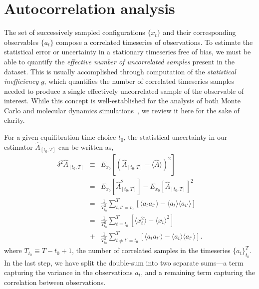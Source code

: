 \documentclass[aps,pre,twocolumn,nofootinbib,superscriptaddress,linenumbers,11point]{revtex4-1}
\newcommand{\expect}[1]{\langle #1 \rangle}                %
\newcommand{\estimator}[1]{\hat{#1}}                       %
\begin{document}

\section*{Autocorrelation analysis}
\label{section:statistical-inefficiency}

The set of successively sampled configurations $\{x_t\}$ and their corresponding observables $\{a_t\}$ compose a correlated timeseries of observations.
To estimate the statistical error or uncertainty in a stationary timeseries free of bias, we must be able to quantify the \emph{effective number of uncorrelated samples} present in the dataset.
This is usually accomplished through computation of the \emph{statistical inefficiency} $g$, which quantifies the number of correlated timeseries samples needed to produce a single effectively uncorrelated sample of the observable of interest.
While this concept is well-established for the analysis of both Monte Carlo and molecular dynamics simulations~\cite{mueller-krumbhaar:j-stat-phys:1973:monte-carlo-analysis,swope:jcp:1982:autocorrelation-analysis,janke:2002:error-analysis,chodera:jctc:2007:wham}, we review it here for the sake of clarity.

For a given equilibration time choice $t_0$, the statistical uncertainty in our estimator $\hat{A}_{[t_0,T]}$ can be written as,
\begin{eqnarray}
\delta^2 \estimator{A}_{[t_0,T]} &\equiv& E_{x_0}\left[\left(\hat{A}_{[t_0,T]} - \expect{\estimator{A}}\right)^2\right] \nonumber \\
&=& E_{x_0}\left[ \hat{A}_{[t_0,T]} ^2 \right] - E_{x_0}\left[ \hat{A}_{[t_0,T]}  \right]^2 \nonumber \\
&=& \frac{1}{T_{t_0}^2} \sum_{t,t'=t_0}^T \left[ \expect{a_t a_{t'}} - \expect{a_t}\expect{a_{t'}} \right] \nonumber \\
&=& \frac{1}{T_{t_0}^2} \sum_{t=t_0}^T \left[ \expect{x_t^2} - \expect{x_t}^2 \right] \nonumber \\
\mbox{} &+& \frac{1}{T_{t_0}^2} \sum_{t\ne t' = t_0}^T \left[ \expect{a_t a_{t'}} - \expect{a_t}\expect{a_{t'}} \right] .
\end{eqnarray}
where $T_{t_0} \equiv T - t_0 + 1$, the number of correlated samples in the timeseries $\{a_t\}_{t_0}^T$.
In the last step, we have split the double-sum into two separate sums---a term capturing the variance in the observations $a_t$, and a remaining term capturing the correlation between observations. 
\end{document}

